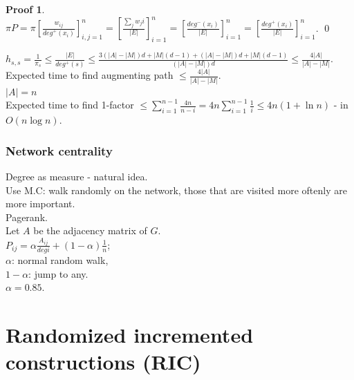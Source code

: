 \documentclass[a4paper, 12pt]{book}
\theoremstyle{definition}
\newtheorem{pro}[counter]{Proof}
\theoremstyle{remark}
\begin{document}
\begin{pro} \text{} \\
  $\pi P = \pi \left[\frac{w_{ij}}{deg^{+}(x_i)}\right]_{i,j=1}^n = \left[\frac{\sum_j w_ji}{|E|}\right]_{i=1}^n
  = \left[\frac{deg^{-}(x_i)}{|E|}\right]_{i=1}^n = \left[\frac{deg^{+}(x_i)}{|E|}\right]_{i=1}^n$.
  \qed
\end{pro}
$h_{s,s} = \frac{1}{\pi_s} \leq \frac{|E|}{deg^{+}(s)} 
\leq \frac{3(|A| - |M|) d + |M| (d-1) + (|A| - |M|) d + |M| (d-1)}{(|A| - |M|) d} \leq \frac{4 |A|}{|A| - |M|}$. \\
Expected time to find augmenting path $\leq \frac{4 |A|}{|A| - |M|}$. \\
$|A| = n$ \\
Expected time to find 1-factor $\leq \sum_{i=1}^{n-1} \frac{4n}{n-i} = 4n \sum_{i=1}^{n-1} \frac{1}{i} \leq 4n (1 + \ln n)$ -
in $O(n \log n)$.

\subsection*{Network centrality}

Degree as measure - natural idea. \\
Use M.C: walk randomly on the network, those that are visited more oftenly are more important. \\
Pagerank. \\
Let $A$ be the adjacency matrix of $G$. \\
$P_{ij} = \alpha \frac{A_{ij}}{deg i} + (1-\alpha) \frac{1}{n}$; \\
$\alpha$: normal random walk, \\
$1-\alpha$: jump to any. \\
$\alpha = 0.85$.



\chapter{Randomized incremented constructions (RIC)}
\end{document}
